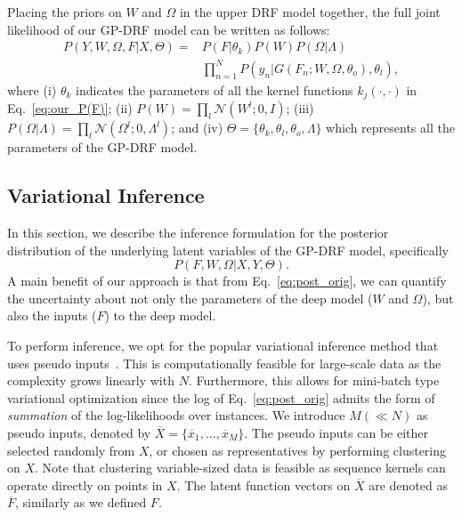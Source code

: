 \documentclass[conference]{IEEEtran}
\begin{document}
Placing the priors on $W$ and $\Omega$ in the upper DRF model together, 
the full joint likelihood of our GP-DRF model can be written as follows: 
\begin{equation}
\begin{split}
P(Y, W, \Omega, F | X, \Theta) = 
&P(F|\theta_k) P(W) P(\Omega|\Lambda) \\
&\prod_{n=1}^N P(y_n|G(F_n; W, \Omega, \theta_o), \theta_l),
\label{eq:our_full_lik}
\end{split}
\end{equation}
where (i) $\theta_k$ indicates the parameters of all the kernel functions 
$k_j(\cdot,\cdot)$ in Eq.~\ref{eq:our_P(F)};
(ii) $P(W) = \prod_l \mathcal{N}(W^l; 0, I)$; 
(iii) $P(\Omega|\Lambda) = \prod_l \mathcal{N}(\Omega^l; 0, \Lambda^l)$; and 
(iv) $\Theta = \{ \theta_k, \theta_l, \theta_o, \Lambda \}$ which represents all 
the parameters of the GP-DRF model. 



\subsection{Variational Inference}\label{sec:inference}

In this section, we describe the inference formulation for the posterior distribution of the underlying latent variables of the GP-DRF model, specifically
\begin{equation}
P(F , W, \Omega | X, Y, \Theta).
\label{eq:post_orig}
\end{equation}
A main benefit of our approach is that from Eq.~\ref{eq:post_orig}, we can quantify the uncertainty about not only the parameters of the deep model ($W$ and $\Omega$), but also the inputs ($F$) to the deep model. 

To perform inference, we opt for the popular variational inference 
method that uses pseudo inputs~\cite{titsias09,dezfouli15}. This is computationally feasible for large-scale data as the complexity grows linearly with $N$. Furthermore,  this allows for mini-batch type variational optimization since the log of Eq.~\ref{eq:post_orig} admits the form of {\em summation} of the log-likelihoods over instances. We introduce $M (\ll N)$ as pseudo inputs, denoted by 
$\overline{X}=\{\overline{x}_1, \dots, \overline{x}_M \}$. The pseudo inputs 
can be either selected randomly from $X$, or chosen as representatives by performing
clustering on $X$. Note that clustering variable-sized data is feasible as sequence kernels can operate directly on points in $X$. The latent function vectors on $\overline{X}$ are denoted as $\overline{F}$, 
similarly as we defined $F$.
\end{document}
